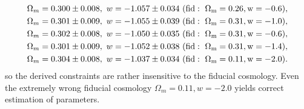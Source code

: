 \documentclass[useAMS,usenatbib]{mnras}
\begin{document}
\begin{eqnarray}
\Omega_m = 0.300 \pm 0.008,\ w=-1.057\pm 0.034\ (\rm fid:\ \Omega_m=0.26, w=-0.6),\\    
\Omega_m = 0.301 \pm 0.009,\ w=-1.055\pm 0.039\ (\rm fid:\ \Omega_m=0.31, w=-1.0),\\
\Omega_m = 0.302 \pm 0.008,\ w=-1.050\pm 0.035\ (\rm fid:\ \Omega_m=0.31, w=-0.6),\\    
\Omega_m = 0.301 \pm 0.009,\ w=-1.052\pm 0.038\ (\rm fid:\ \Omega_m=0.31, w=-1.4),\\    
\Omega_m = 0.304 \pm 0.008,\ w=-1.037\pm 0.034\ (\rm fid:\ \Omega_m=0.11, w=-2.0).\\    
% 
\end{eqnarray}
so the derived constraints are rather insensitive to the fiducial cosmology.
Even the extremely wrong fiducial cosmology $\Omega_m=0.11, w=-2.0$ yields correct estimation of parameters.
\end{document}
